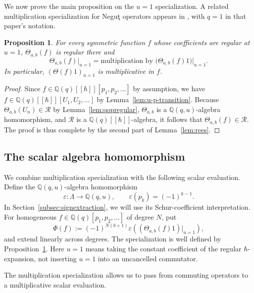 \documentclass[12pt,reqno]{amsart}
\numberwithin{equation}{section}
\newtheorem{proposition}[theorem]{Proposition}
\theoremstyle{definition}
\theoremstyle{remark}
\theoremstyle{plain}
\newcommand{\QQ}{\mathbb Q}
\begin{document}
We now prove the main proposition on the $u=1$ specialization. A related multiplication specialization for Negu\c{t}
operators appears in \cite[Lemma~4.6]{DIIP}, with $q=1$ in that
paper's notation.

\begin{proposition}\label{prop:multiplication}
For every symmetric function $f$ whose coefficients are regular at $u=1$,
$\Theta_{a,b}(f)$ is regular there and
\begin{equation}\label{eq:multspecial}
 \Theta_{a,b}(f)\big|_{u=1}
 =\text{multiplication by }\bigl(\Theta_{a,b}(f)1\bigr)\big|_{u=1}.
\end{equation}
In particular, $(\Theta(f)1)_{u=1}$ is multiplicative in $f$.
\end{proposition}
\begin{proof}
Since  $f\in \QQ(q)[[\hbar]][p_1,p_2,\dots]$ by assumption, we have $f\in \QQ(q)[[\hbar]][U_1,U_2,\dots]$ by Lemma~\ref{lem:u-p-transition}.  Because $\Theta_{a,b}(U_n)\in \mathscr{R}$ by Lemma~\ref{lem:qopregular}, $\Theta_{a,b}$ is a $\QQ(q,u)$-algebra homomorphism, and $\mathscr R$ is a $\QQ(q)[[\hbar]]$-algebra, it follows that $\Theta_{a,b}(f)\in \mathscr{R}$.
The proof is thus complete by the second part of Lemma~\ref{lem:rees}. 
\end{proof}

\subsection{The scalar algebra homomorphism}
We combine multiplication specialization with the following scalar
evaluation.  Define the $\QQ(q,u)$-algebra homomorphism
\begin{equation}\label{eq:sign}
 \varepsilon:\Lambda\longrightarrow\QQ(q,u),\qquad
 \varepsilon(p_k)=(-1)^{k-1}.
\end{equation}
In
Section~\ref{subsec:signextraction}, we will use its Schur-coefficient interpretation.
For homogeneous $f\in\QQ(q)[p_1,p_2,\ldots]$ of degree $N$, put
\begin{equation}\label{eq:Phi}
 \Phi(f):=(-1)^{N(b+1)}
       \varepsilon\!\left((\Theta_{a,b}(f)1)|_{u=1}\right),
\end{equation}
and extend linearly across degrees.  The specialization is well defined
by Proposition~\ref{prop:multiplication}.
Here $u=1$ means taking the constant coefficient of the regular
$\hbar$-expansion, not inserting $u=1$ into an uncancelled commutator.

The multiplication specialization allows us to pass from commuting
operators to a multiplicative scalar evaluation.
\end{document}
